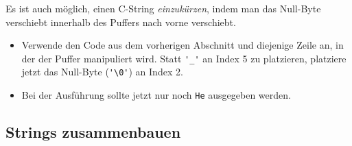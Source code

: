 Es ist auch möglich, einen C-String \emph{einzukürzen}, indem man das Null-Byte verschiebt innerhalb des Puffers nach vorne verschiebt.
\begin{itemize}
\item
Verwende den Code aus dem vorherigen Abschnitt und diejenige Zeile an, in der der Puffer manipuliert wird.
Statt \lstinline|'_'| an Index 5 zu platzieren, platziere jetzt das Null-Byte (\lstinline|'\0'|) an Index 2.
\item 
Bei der Ausführung sollte jetzt nur noch \texttt{He} ausgegeben werden.
\end{itemize}

\subsection{Strings zusammenbauen}

